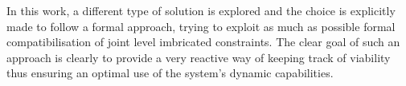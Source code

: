 In this work, a different type of solution is explored and the choice is explicitly made to follow a formal approach, trying to exploit as much as possible formal compatibilisation of joint level imbricated constraints. The clear goal of such an approach is clearly to provide a very reactive way of keeping track of viability thus ensuring an optimal use of the system's dynamic capabilities.
